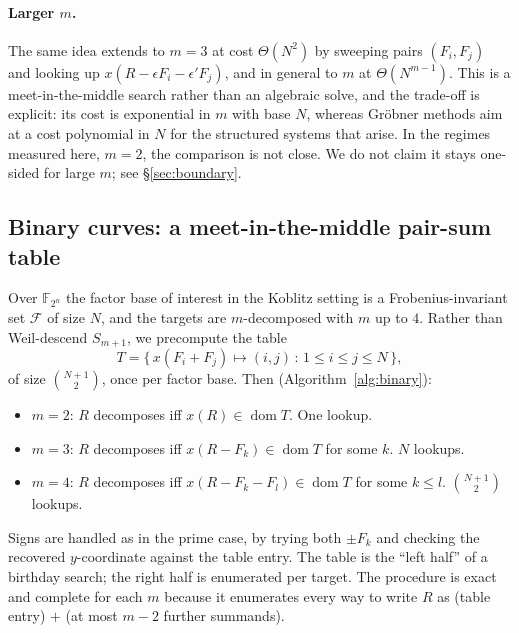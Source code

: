 \documentclass[10pt,a4paper]{article}
\theoremstyle{remark}
\newcommand{\FF}{\mathbb{F}}
\newcommand{\Fb}{\mathcal{F}}
\newcommand{\Sem}[1]{S_{#1}}
\begin{document}
\paragraph{Larger $m$.} The same idea extends to $m = 3$ at cost
$\Theta(N^2)$ by sweeping pairs $(F_i, F_j)$ and looking up
$x(R - \epsilon F_i - \epsilon' F_j)$, and in general to $m$ at
$\Theta(N^{m-1})$. This is a meet-in-the-middle search rather than an
algebraic solve, and the trade-off is explicit: its cost is exponential
in $m$ with base $N$, whereas Gr\"obner methods aim at a cost polynomial
in $N$ for the structured systems that arise. In the regimes measured
here, $m = 2$, the comparison is not close. We do not claim it stays
one-sided for large $m$; see \S\ref{sec:boundary}.

\subsection{Binary curves: a meet-in-the-middle pair-sum table}

Over $\FF_{2^n}$ the factor base of interest in the Koblitz setting is a
Frobenius-invariant set $\Fb$ of size $N$, and the targets are
$m$-decomposed with $m$ up to $4$. Rather than Weil-descend $\Sem{m+1}$,
we precompute the table
\[
  T = \big\{\, x(F_i + F_j) \mapsto (i, j) \,:\, 1 \le i \le j \le N \,\big\},
\]
of size $\binom{N+1}{2}$, once per factor base. Then
(Algorithm~\ref{alg:binary}):
\begin{itemize}
\item $m = 2$: $R$ decomposes iff $x(R) \in \operatorname{dom} T$. One lookup.
\item $m = 3$: $R$ decomposes iff $x(R - F_k) \in \operatorname{dom} T$
  for some $k$. $N$ lookups.
\item $m = 4$: $R$ decomposes iff $x(R - F_k - F_l) \in \operatorname{dom} T$
  for some $k \le l$. $\binom{N+1}{2}$ lookups.
\end{itemize}
Signs are handled as in the prime case, by trying both $\pm F_k$ and
checking the recovered $y$-coordinate against the table entry. The
table is the ``left half'' of a birthday search; the right half is
enumerated per target. The procedure is exact and complete for each $m$
because it enumerates every way to write $R$ as (table entry) $+$ (at
most $m - 2$ further summands).
\end{document}
